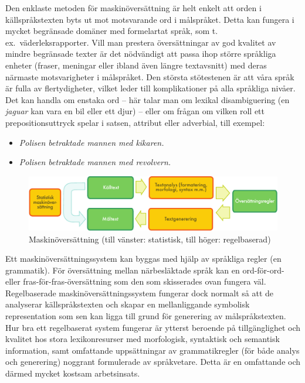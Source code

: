 \begin{multicols}{2}
Den enklaste metoden för maskin\-över\-sätt\-ning är helt enkelt att orden i
källspråkstexten byts ut mot motsvarande ord i målspråket. Detta kan
fungera i mycket begränsade domäner med formelartat språk, som
t.\,ex.~väderleksrapporter. Vill man prestera översättningar av god
kvalitet av mindre begränsade texter är det nödvändigt att passa ihop
större språkliga enheter (fraser, meningar eller ibland även längre
textavsnitt) med deras närmaste motsvarigheter i målspråket. Den
största stötestenen är att våra språk är fulla av flertydigheter,
vilket leder till komplikationer på alla språkliga nivåer. Det kan
handla om enstaka ord -- här talar man om lexikal disambiguering (en
\textit{jaguar} kan vara en bil eller ett djur) -- eller om
frågan om vilken roll ett prepositionsuttryck spelar i satsen,
attribut eller adverbial, till exempel:

\begin{itemize}
\item \textit{Polisen betraktade mannen med kikaren.}
\item \textit{Polisen betraktade mannen med revolvern.}
\end{itemize}

\begin{figure}[htb]
  \center
  \includegraphics[width=\textwidth]{../_media/swedish/machine_translation}
  \caption{Maskinöversättning (till vänster: statistisk, till höger: regelbaserad)}
  \label{fig:mtarch_sv}
\end{figure}

Ett maskin\-över\-sätt\-nings\-system kan byggas med hjälp av språkliga regler
(en grammatik). För översättning mellan närbesläktade språk kan en
ord-för-ord- eller fras-för-fras-översättning som den som skisserades
ovan fungera väl. Regelbaserade maskin\-över\-sätt\-nings\-system fungerar
dock normalt så att de analyserar källspråkstexten och skapar en
mellanliggande symbolisk representation som sen kan ligga till grund
för generering av målspråkstexten. Hur bra ett regelbaserat system
fungerar är ytterst beroende på tillgänglighet och kvalitet hos stora
lexikonresurser med morfologisk, syntaktisk och semantisk information,
samt omfattande uppsättningar av grammatikregler (för både analys och
generering) noggrant formulerade av språkvetare. Detta är en
omfattande och därmed mycket kostsam arbetsinsats.


\end{multicols}

